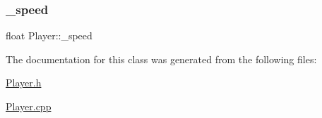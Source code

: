 \mbox{\label{class_player_a2058005a9cb8d0ee1930178ab5965ac1}} 
\subsubsection{\texorpdfstring{\+\_\+speed}{\_speed}}
{\footnotesize\ttfamily float Player\+::\+\_\+speed\hspace{0.3cm}{\ttfamily [private]}}



The documentation for this class was generated from the following files\+:\begin{DoxyCompactItemize}
\item 
\hyperlink{_player_8h}{Player.\+h}\item 
\hyperlink{_player_8cpp}{Player.\+cpp}\end{DoxyCompactItemize}
